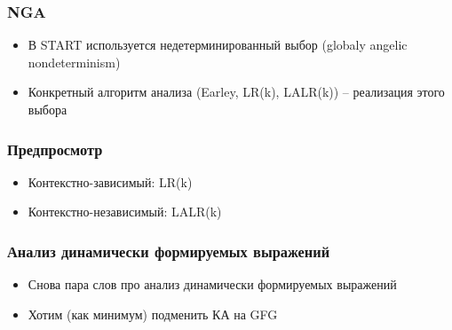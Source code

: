 \documentclass{beamer}
\begin{document}
\begin{frame}
    \transwipe[direction=90]
    \frametitle{NGA}
    \begin{itemize}
        \item В START используется недетерминированный выбор (globaly angelic nondeterminism)
        \item Конкретный алгоритм анализа (Earley, LR(k), LALR(k)) -- реализация этого выбора
    \end{itemize}
\end{frame}

\begin{frame}
    \transwipe[direction=90]
    \frametitle{Предпросмотр}
    \begin{itemize}
        \item Контекстно-зависимый: LR(k)
        \item Контекстно-независимый: LALR(k)
    \end{itemize}
\end{frame}

\begin{frame}
    \transwipe[direction=90]
    \frametitle{Анализ динамически формируемых выражений}
    \begin{itemize}
        \item Снова пара слов про анализ динамически формируемых выражений
        \item Хотим (как минимум) подменить КА на GFG
    \end{itemize}
\end{frame}
\end{document}
